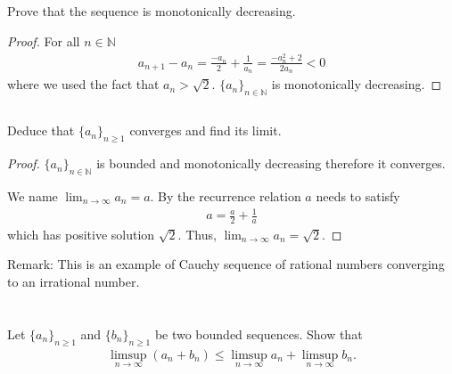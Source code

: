 \documentclass[11pt,letterpaper]{article}
\begin{document}
\subsection{} Prove that the sequence is monotonically decreasing.
\begin{proof}
For all $n\in \mathbb{N}$
\begin{align*}
    a_{n+1}-a_n = \frac{-a_n}{2}+\frac{1}{a_n} = \frac{-a_n^2+2}{2a_n}<0
\end{align*}
where we used the fact that $a_n > \sqrt{2}$. $\{a_n\}_{n\in \mathbb{N}}$ is monotonically decreasing.
\end{proof}

\subsection{} Deduce that $\{a_n\}_{n\geq 1}$ converges and find its limit.
\begin{proof}
$\{a_n\}_{n\in \mathbb{N}}$ is bounded and monotonically decreasing therefore it converges.

We name $\lim_{n\rightarrow \infty}a_n = a$. By the recurrence relation $a$ needs to satisfy
\begin{align}
    a=\frac{a}{2}+\frac{1}{a}
\end{align}
which has positive solution $\sqrt{2}$. Thus, $\lim_{n\rightarrow \infty}a_n = \sqrt{2}$.
\end{proof}

Remark: This is an example of Cauchy sequence of rational numbers
converging to an irrational number.

\section{}
Let $\{a_n\}_{n\geq 1}$ and $\{b_n\}_{n\geq 1}$ be two bounded sequences. Show that
\begin{align}
    \limsup_{n\to\infty} (a_n+b_n) \leq \limsup_{n\to\infty} a_n+\limsup_{n\to\infty} b_n.
\end{align}
\end{document}
